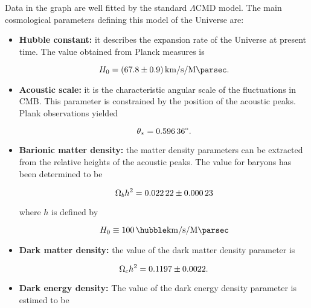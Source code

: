 Data in the graph are well fitted by the standard
$\Lambda$CMD model. The main cosmological parameters defining this model of
the Universe are:

\begin{itemize}
        \item \textbf{Hubble constant:} it describes the expansion rate of
        the Universe at present time. The value obtained from Planck
        measures is

        \begin{equation}
                H_0 = \SI{67.8 \pm 0.9}{\kilo\meter\per\second\per\mega\parsec}.
        \end{equation}

        \item \textbf{Acoustic scale:} it is the characteristic angular
        scale of the fluctuations in CMB. This parameter is constrained by
        the position of the acoustic peaks. Plank observations yielded

        \begin{equation}
                \theta_* = \ang{0.59636 \pm 0.00025}.
        \end{equation}

        \item \textbf{Barionic matter density:} the matter density
        parameters can be extracted from the relative heights of the 
        acoustic peaks. The value for baryons has been determined to be

        \begin{equation}
                \Omega_b h^2 = \num{0.02222 \pm 0.00023}
        \end{equation}

        where $h$ is defined by

        \begin{equation}
                H_0 \equiv \SI{100}{\hubble\kilo\meter\per\second\per\mega\parsec} 
        \end{equation}

        \item \textbf{Dark matter density:} the value of the dark matter
        density parameter is

        \begin{equation}
                \Omega_c h^2 = \num{0.1197 \pm 0.0022}.
        \end{equation}

        \item \textbf{Dark energy density:} The value of the dark energy
        density parameter is estimed to be


\end{itemize}
